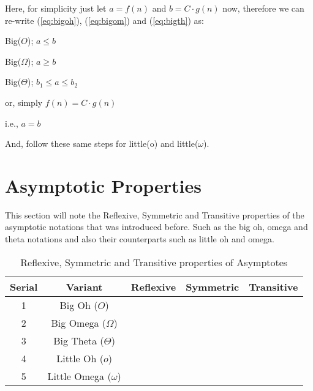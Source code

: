 \documentclass[a4paper,12pt]{article}
\theoremstyle{definition}
\newcommand{\cmark}{\ding{51}}
\newcommand{\xmark}{\ding{55}}
\begin{document}
    \noindent
    Here, for simplicity just let $a = f(n)$ and $b = C \cdot g(n)$ now, therefore we can re-write (\ref{eq:bigoh}), (\ref{eq:bigom}) and (\ref{eq:bigth}) as:

    Big($O$); $a \leq b$

    Big($\Omega$); $a \geq b$

    Big($\Theta$); $b_1 \leq a \leq b_2$

    or, simply $f(n) = C \cdot g(n)$

    i.e., $a = b$

    \noindent
    And, follow these same steps for little(o) and little($\omega$).


    \section{Asymptotic Properties}

    This section will note the Reflexive, Symmetric and Transitive properties of the asymptotic notations that
    was introduced before.
    Such as the big oh, omega and theta notations and also their counterparts such as little oh and omega.

    \begin{table}[!hbt]
        \centering
        \caption{Reflexive, Symmetric and Transitive properties of Asymptotes}
        \label{tb:asmp}
        \begin{tabular}{|c|c|c|c|c|}
            \hline \textbf{Serial} & \textbf{Variant}        & \textbf{Reflexive} & \textbf{Symmetric} & \textbf{Transitive} \\
            \hline 1               & Big Oh ($O$)            & \cmark             & \xmark             & \cmark              \\
            \hline 2               & Big Omega ($\Omega$)    & \cmark             & \xmark             & \cmark              \\
            \hline 3               & Big Theta ($\Theta$)    & \cmark             & \cmark             & \cmark              \\
            \hline 4               & Little Oh ($o$)         & \xmark             & \xmark             & \cmark              \\
            \hline 5               & Little Omega ($\omega$) & \xmark             & \xmark             & \cmark              \\
            \hline
        \end{tabular}
    \end{table}
\end{document}

